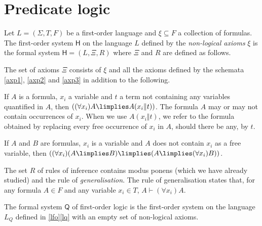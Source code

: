 
\section{Predicate logic}

\begin{definition}
Let $L = (\Sigma, T, F)$ be a first-order language and $\xi\subseteq F$ a collection of formulas.
The first-order system $\mathsf{H}$ on the language $L$ defined by the \emph{non-logical axioms} $\xi$ is the formal system $\mathsf{H} = (L,\Xi,R)$ where $\Xi$ and $R$ are defined as follows.

The set of axioms $\Xi$ consists of $\xi$ and all the axioms defined by the schemata \ref{axp1}, \ref{axp2} and \ref{axp3} in addition to the following.
\begin{axioms}[Q]
\item \label{axq1} If $A$ is a formula, $x_i$ a variable and $t$ a term not containing any variables quantified in $A$, then $((\forall x_i) A \limplies A(x_i\Vert t))$.
The formula $A$ may or may not contain occurrences of $x_i$.
When we use $A(x_i\Vert t)$, we refer to the formula obtained by replacing every free occurrence of $x_i$ in $A$, should there be any, by $t$.
\item \label{axq2} If $A$ and $B$ are formulas, $x_i$ is a variable and $A$ does not contain $x_i$ as a free variable, then $((\forall x_i)(A\limplies B)\limplies (A\limplies (\forall x_i) B))$.
\end{axioms}

The set $R$ of rules of inference contains modus ponens (which we have already studied) and the rule of \emph{generalisation}. The rule of generalisation states that, for any formula $A\in F$ and any variable $x_i\in T$, $A\vdash (\forall x_i) A$.

The formal system $\mathsf{Q}$ of first-order logic is the first-order system on the language $L_Q$ defined in \ref{lfo}\ref{lq} with an empty set of non-logical axioms.
\end{definition}

